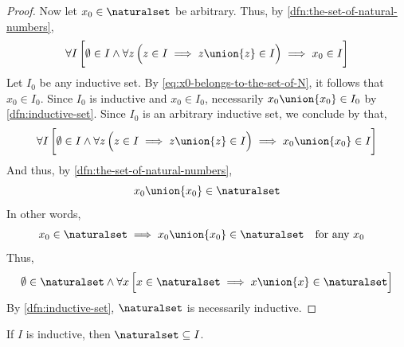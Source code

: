 \begin{proof}
    \vspace{0.3cm}
    \noindent
    Now let \( x_{0} \in \naturalset \) be arbitrary. Thus, by \cref{dfn:the-set-of-natural-numbers},
    \begin{equation}
        \label{eq:x0-belongs-to-the-set-of-N}
        \forall I \, \bigg[ \emptyset \in I \land \forall z \, \Big( z \in I \implies z \union \mleft\{ z \mright\} \in I \Big) \implies x_{0} \in I \bigg]
    \end{equation}
    Let \( I_{0} \) be any inductive set. By \eqref{eq:x0-belongs-to-the-set-of-N}, it follows that \( x_{0} \in I_{0} \). Since \( I_{0} \) is inductive and
    \( x_{0} \in I_{0} \), necessarily \( x_{0} \union \mleft\{ x_{0} \mright\} \in I_{0} \) by \cref{dfn:inductive-set}. Since \( I_{0} \) is an arbitrary inductive
    set, we conclude by  that,
    \begin{equation*}
        \forall I \, \bigg[ \emptyset \in I \land
        \forall z \, \Big( z \in I \implies z \union \mleft\{ z \mright\} \in I \Big) \implies
        x_{0} \union \mleft\{ x_{0} \mright\} \in  I \bigg]\\
    \end{equation*}
    And thus, by \cref{dfn:the-set-of-natural-numbers},
    \begin{equation*}
        x_{0} \union \mleft\{ x_{0} \mright\} \in \naturalset
    \end{equation*}
    In other words,
    \begin{equation*}
        \begin{aligned}
            x_{0} \in \naturalset \implies x_{0} \union \mleft\{ x_{0} \mright\} \in \naturalset&
        \end{aligned}
        \begin{aligned}
            &\text{for any \( x_{0} \)}
        \end{aligned}
    \end{equation*}
    Thus,
    \begin{equation*}
        \emptyset \in \naturalset \land \forall x \, \Big[ x \in \naturalset \implies x \union \mleft\{ x \mright\} \in \naturalset \Big]
    \end{equation*}
    By \cref{dfn:inductive-set}, \( \naturalset \) is necessarily inductive.
\end{proof}

\begin{thm}
    \label{thm:the-set-of-natural-numbers-is-a-subset-of-any-inductive-set}
    If \( I \) is inductive, then \( \naturalset \subseteq I \).
\end{thm}

